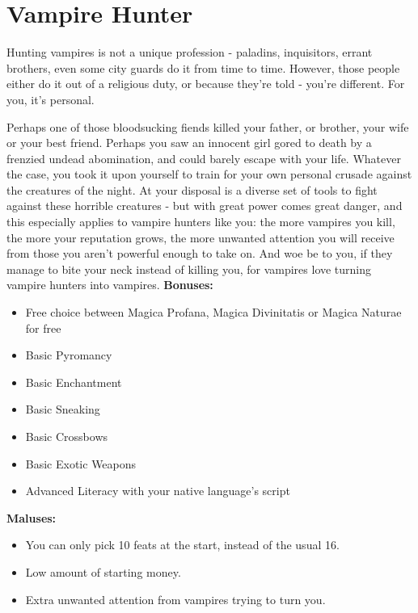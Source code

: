 \section{Vampire Hunter}
Hunting vampires is not a unique profession - paladins, inquisitors, errant brothers, even some city guards do it from time to time. However, those people either do it out of a  religious duty, or because they're told - you're different. For you, it's personal.

Perhaps one of those bloodsucking fiends killed your father, or brother, your wife or your best friend. Perhaps you saw an innocent girl gored to death by a frenzied undead abomination, and could barely escape with your life. Whatever the case, you took it upon yourself to train for your own personal crusade against the creatures of the night. At your disposal is a diverse set of tools to fight against these horrible creatures - but with great power comes great danger, and this especially applies to vampire hunters like you: the more vampires you kill, the more your reputation grows, the more unwanted attention you will receive from those you aren't powerful enough to take on. And woe be to you, if they manage to bite your neck instead of killing you, for vampires love turning vampire hunters into vampires.\newline
\textbf{Bonuses:}
\begin{itemize}
	\item Free choice between Magica Profana, Magica Divinitatis or Magica Naturae for free
	\item Basic Pyromancy
	\item Basic Enchantment
	\item Basic Sneaking
	\item Basic Crossbows
	\item Basic Exotic Weapons
	\item Advanced Literacy with your native language's script
\end{itemize}
\textbf{Maluses:}
\begin{itemize}
	\item You can only pick 10 feats at the start, instead of the usual 16.
	\item Low amount of starting money.
	\item Extra unwanted attention from vampires trying to turn you. 
\end{itemize}

